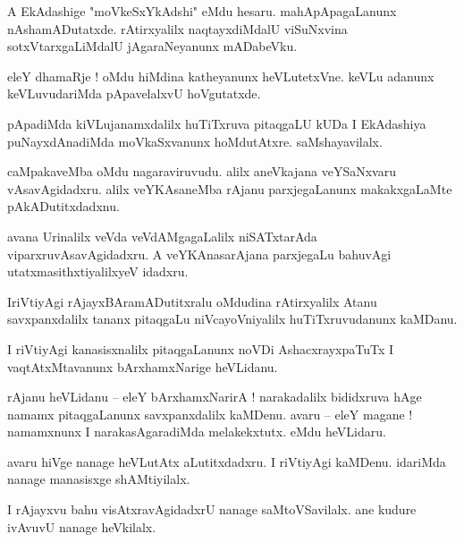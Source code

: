 \documentclass{article}
\begin{document}
\begin{mn}%
A EkAdashige "moVkeSxYkAdshi" eMdu hesaru. mahApApagaLanunx nAshamADutatxde. rAtirxyalilx 
naqtayxdiMdalU viSuNxvina sotxVtarxgaLiMdalU jAgaraNeyanunx mADabeVku.
\end{mn}

\begin{mn}%
eleY dhamaRje ! oMdu hiMdina katheyanunx heVLutetxVne. keVLu adanunx keVLuvudariMda pApavelalxvU 
hoVgutatxde.
\end{mn}

\begin{mn}%
pApadiMda kiVLujanamxdalilx huTiTxruva pitaqgaLU kUDa I EkAdashiya puNayxdAnadiMda moVkaSxvanunx 
hoMdutAtxre. saMshayavilalx.
\end{mn}

\begin{mn}%
caMpakaveMba oMdu nagaraviruvudu. alilx aneVkajana veYSaNxvaru vAsavAgidadxru. alilx veYKAsaneMba 
rAjanu parxjegaLanunx makakxgaLaMte pAkADutitxdadxnu.
\end{mn}

\begin{mn}%
avana Urinalilx veVda veVdAMgagaLalilx niSATxtarAda viparxruvAsavAgidadxru. A veYKAnasarAjana 
parxjegaLu bahuvAgi utatxmasithxtiyalilxyeV idadxru.
\end{mn}

\begin{mn}%
IriVtiyAgi rAjayxBAramADutitxralu oMdudina rAtirxyalilx Atanu savxpanxdalilx tananx pitaqgaLu 
niVcayoVniyalilx huTiTxruvudanunx kaMDanu.
\end{mn}

\begin{mn}%
I riVtiyAgi kanasisxnalilx pitaqgaLanunx noVDi AshacxrayxpaTuTx I vaqtAtxMtavanunx bArxhamxNarige 
heVLidanu.
\end{mn}

\begin{mn}%
rAjanu heVLidanu -- eleY bArxhamxNarirA ! narakadalilx bididxruva hAge namamx pitaqgaLanunx 
savxpanxdalilx kaMDenu. avaru -- eleY magane ! namamxnunx I narakasAgaradiMda melakekxtutx. eMdu 
heVLidaru.
\end{mn}

\begin{mn}%
avaru hiVge nanage heVLutAtx aLutitxdadxru. I riVtiyAgi kaMDenu. idariMda nanage manasisxge 
shAMtiyilalx.
\end{mn}

\begin{mn}%
I rAjayxvu bahu visAtxravAgidadxrU nanage saMtoVSavilalx. ane kudure ivAvuvU nanage heVkilalx.
\end{mn}
\end{document}
